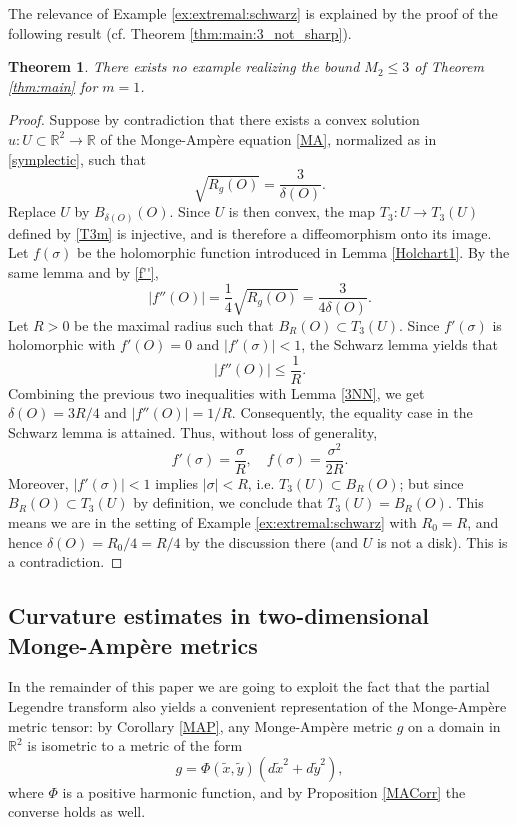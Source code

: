 \documentclass[11pt,reqno]{amsart}
\newcommand{\R}{\mathbb{R}}
\renewcommand{\leq}{\leqslant}
\theoremstyle{plain}
\newtheorem{theorem}{Theorem}[section]
\theoremstyle{definition}
\numberwithin{equation}{section}
\begin{document}
The relevance of Example \ref{ex:extremal:schwarz} is explained by the proof of the following result (cf. Theorem \ref{thm:main:3_not_sharp}).

\begin{theorem}\label{T2B}
    There exists no example realizing the bound $M_2 \leq 3$ of Theorem \ref{thm:main} for $m = 1$.
\end{theorem}

\begin{proof}
    Suppose by contradiction that there exists a convex solution $u:U \subset \R^2\to \mathbb{R}$ of the Monge-Ampère equation \eqref{MA}, normalized as in \eqref{symplectic}, such that 
$$\sqrt{R_g(O)}=\frac{3}{\delta(O)}.$$
Replace $U$ by $B_{\delta(O)}(O)$. Since $U$ is then convex, the map $T_{3}:U\to T_{3}(U)$ defined by \eqref{T3m} is injective, and is therefore a diffeomorphism onto its image.
Let $f(\sigma)$ be the holomorphic function introduced in Lemma \ref{Holchart1}. By the same lemma and by \eqref{f''},
$$|f''(O)| = \frac{1}{4}\sqrt{R_g(O)}=\frac{3}{4\delta(O)}.$$
Let $R>0$ be the maximal radius such that $B_{R}(O)\subset T_{3}(U)$. Since $f'(\sigma)$ is holomorphic with $f'(O)=0$ and $|f'(\sigma)| < 1$, the Schwarz lemma yields that
$$|f''(O)|\leq \frac{1}{R}.$$
Combining the previous two inequalities with Lemma \ref{3NN}, we get $\delta(O)=3R/4$ and
$|f''(O)|=1/R$. Consequently, the equality case in the Schwarz lemma is attained. Thus, without loss of generality,
$$f'(\sigma)=\frac{\sigma}{R},\quad f(\sigma)=\frac{\sigma^{2}}{2R}.$$
Moreover, $|f'(\sigma)|<1$ implies $|\sigma|<R$, i.e. $T_{3}(U)\subset B_{R}(O)$; but since $B_{R}(O)\subset T_{3}(U)$ by definition, we conclude that $T_{3}(U)=B_{R}(O)$. This means we are in the setting of Example \ref{ex:extremal:schwarz} with $R_0 = R$, and hence $\delta(O) = R_0/4 = R/4$ by the discussion there (and $U$ is not a disk). This is a contradiction.
\end{proof}

\subsection{Curvature estimates in two-dimensional Monge-Ampère metrics} 

In the remainder of this paper we are going to exploit the fact that the partial Legendre transform also yields a convenient representation of the Monge-Ampère metric tensor: by Corollary \ref{MAP}, any Monge-Ampère metric $g$ on a domain in $\mathbb{R}^2$ is isometric to a metric of the form
$$g = \Phi(\tilde{x},\tilde{y})(d\tilde{x}^2+d\tilde{y}^2),$$
where $\Phi$ is a positive harmonic function, and by Proposition \ref{MACorr} the converse holds as well.
\end{document}
